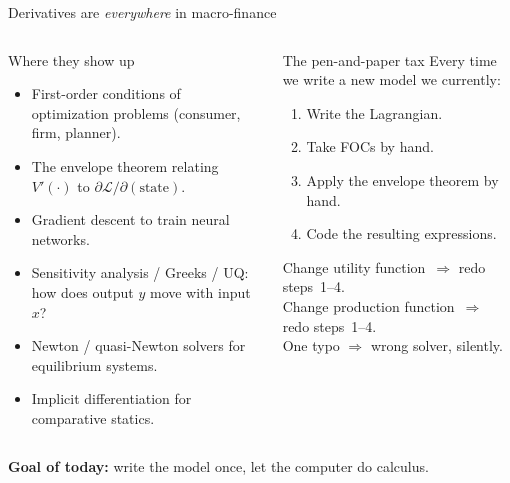 \documentclass[aspectratio=169,11pt]{beamer}
\newcommand{\emphc}[1]{\textcolor{harvardcrimson}{#1}}
\begin{document}
\begin{frame}{Derivatives are \emph{everywhere} in macro-finance}
\begin{columns}[t]
\begin{block}{Where they show up}
\small
\begin{itemize}\itemsep3pt
  \item \emphc{First-order conditions} of optimization problems (consumer, firm, planner).
  \item The \emphc{envelope theorem} relating $V'(\cdot)$ to $\partial \mathcal{L}/\partial (\text{state})$.
  \item \emphc{Gradient descent} to train neural networks.
  \item \emphc{Sensitivity analysis / Greeks / UQ}: how does output $y$ move with input $x$?
  \item \emphc{Newton / quasi-Newton} solvers for equilibrium systems.
  \item \emphc{Implicit differentiation} for comparative statics.
\end{itemize}
\end{block}

\begin{alertblock}{The pen-and-paper tax}
\small
Every time we write a new model we currently:
\begin{enumerate}\itemsep2pt
  \item Write the Lagrangian.
  \item Take FOCs by hand.
  \item Apply the envelope theorem by hand.
  \item Code the resulting expressions.
\end{enumerate}
Change utility function~$\Rightarrow$ redo steps~1--4.\\
Change production function~$\Rightarrow$ redo steps~1--4.\\
One typo $\Rightarrow$ wrong solver, silently.
\end{alertblock}
\end{columns}
\vspace{4pt}
\centerline{\emphc{\textbf{Goal of today:}} write the model once, let the computer do calculus.}
\end{frame}
\end{document}
